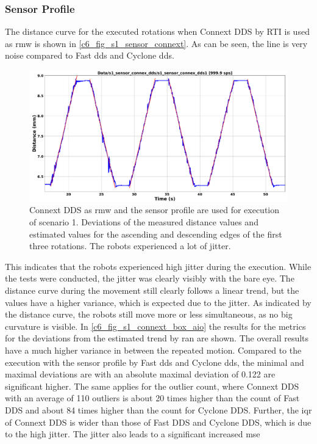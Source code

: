 \subsubsection{Sensor Profile}The distance curve for the executed rotations when Connext DDS by RTI is used as \gls{rmw} is shown in \autoref{c6_fig_s1_sensor_connext}. As can be seen, the line is very noise compared to Fast \gls{dds} and Cyclone \gls{dds}.
\begin{figure}[htbp]
	\centering
	\includegraphics[width=1\textwidth]{Figures/c6/s1/s1_sensor_connext_dds.pdf}
	\caption{Connext DDS as \gls{rmw} and the sensor profile are used for execution of scenario 1. Deviations of the measured distance values and estimated values for the ascending and descending edges of the first three rotations. The robots experienced a lot of jitter.}
	\label{c6_fig_s1_sensor_connext}
\end{figure}
This indicates that the robots experienced high jitter during the execution. While the tests were conducted, the jitter was clearly visibly with the bare eye. The distance curve during the movement still clearly follows a linear trend, but the values have a higher variance, which is expected due to the jitter. As indicated by the distance curve, the robots still move more or less simultaneous, as no big curvature is visible.\newline
In \autoref{c6_fig_s1_connext_box_aio} the results for the metrics for the deviations from the estimated trend by \gls{ran} are shown. The overall results have a much higher variance in between the repeated motion. Compared to the execution with the sensor profile by Fast \gls{dds} and Cyclone \gls{dds}, the minimal and maximal deviations are with an absolute maximal deviation of 0.122 are significant higher. The same applies for the outlier count, where Connext DDS with an average of 110 outliers is about 20 times higher than the count of Fast DDS and about 84 times higher than the count for Cyclone DDS. Further, the \gls{iqr} of Connext DDS is wider than those of Fast DDS and Cyclone DDS, which is due to the high jitter. The jitter also leads to a significant increased \gls{mse}
